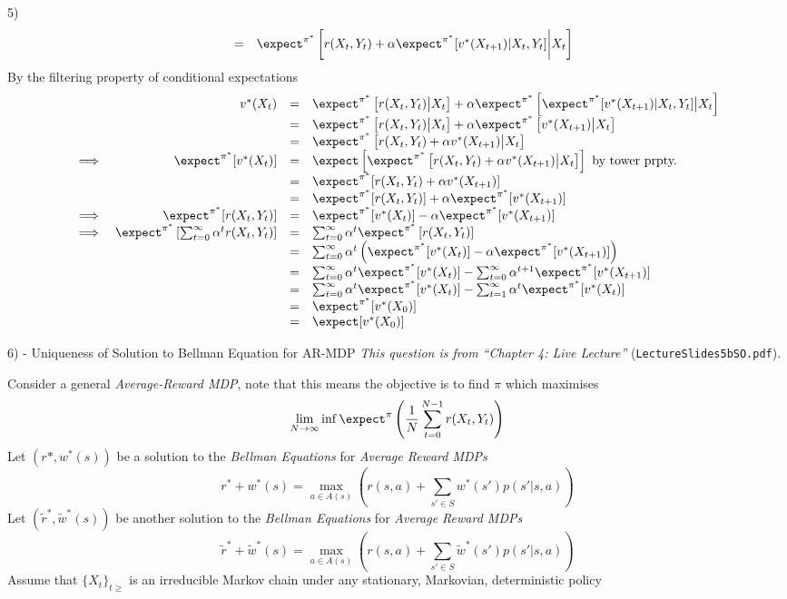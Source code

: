 \documentclass[11pt,a4paper]{article}
\begin{document}
\begin{answer}{5)}
\[\begin{array}{rcl}
    &=&\expect^{\pi^*}\left[r(X_t,Y_t)+\alpha\expect^{\pi^*}[v^*(X_{t+1})|X_t,Y_t]\bigg|X_t\right]
  \end{array}\]
  By the filtering property of conditional expectations
  \[\begin{array}{rrcl}
    &v^*(X_t)&=&\expect^{\pi^*}\left[r(X_t,Y_t)\big|X_t\right]+\alpha\expect^{\pi^*}\left[\expect^{\pi^*}[v^*(X_{t+1})|X_t,Y_t]\big|X_t\right]\\
    &&=&\expect^{\pi^*}\left[r(X_t,Y_t)\big|X_t\right]+\alpha\expect^{\pi^*}\left[v^*(X_{t+1})\big|X_t\right]\\
    &&=&\expect^{\pi^*}\left[r(X_t,Y_t)+\alpha v^*(X_{t+1})\big|X_t\right]\\
    \implies&\expect^{\pi^*}[v^*(X_t)]&=&\expect\left[\expect^{\pi^*}\left[r(X_t,Y_t)+\alpha v^*(X_{t+1})\big|X_t\right]\right]\text{ by tower prpty.}\\
    &&=&\expect^{\pi^*}[r(X_t,Y_t)+\alpha v^*(X_{t+1})]\\
    &&=&\expect^{\pi^*}[r(X_t,Y_t)]+\alpha \expect^{\pi^*}[v^*(X_{t+1})]\\
    \implies&\expect^{\pi^*}[r(X_t,Y_t)]&=&\expect^{\pi^*}[v^*(X_t)]-\alpha\expect^{\pi^*}[v^*(X_{t+1})]\\
    \implies&\expect^{\pi^*}\left[\sum_{t=0}^\infty\alpha^tr(X_t,Y_t)\right]&=&\sum_{t=0}^\infty\alpha^t\expect^{\pi^*}\left[r(X_t,Y_t)\right]\\
    &&=&\sum_{t=0}^\infty\alpha^t\left(\expect^{\pi^*}[v^*(X_t)]-\alpha\expect^{\pi^*}[v^*(X_{t+1})]\right)\\
    &&=&\sum_{t=0}^\infty\alpha^t\expect^{\pi^*}[v^*(X_t)]-\sum_{t=0}^\infty\alpha^{t+1}\expect^{\pi^*}[v^*(X_{t+1})]\\
    &&=&\sum_{t=0}^\infty\alpha^t\expect^{\pi^*}[v^*(X_t)]-\sum_{t=1}^\infty\alpha^t\expect^{\pi^*}[v^*(X_t)]\\
    &&=&\expect^{\pi^*}[v^*(X_0)]\\
    &&=&\expect[v^*(X_0)]
  \end{array}\]
\end{answer}

\newpage
\begin{question}{6) - Uniqueness of Solution to Bellman Equation for AR-MDP}
  \textit{This question is from ``Chapter 4: Live Lecture''} (\texttt{LectureSlides5bSO.pdf}).
  \par Consider a general \textit{Average-Reward MDP}, note that this means the objective is to find $\pi$ which maximises
  \[ \lim_{N\to\infty}\inf\expect^\pi\left(\frac1N\sum_{t=0}^{N-1}r(X_t,Y_t)\right) \]
  Let $(r*,w^*(s))$ be a solution to the \textit{Bellman Equations} for \textit{Average Reward MDPs}
  \[ r^*+w^*(s)=\max_{a\in A(s)}\left(r(s,a)+\sum_{s'\in S}w^*(s')p(s'|s,a)\right) \]
  Let $(\tilde{r}^*,\tilde{w}^*(s))$ be another solution to the \textit{Bellman Equations} for \textit{Average Reward MDPs}
  \[ \tilde{r}^*+\tilde{w}^*(s)=\max_{a\in A(s)}\left(r(s,a)+\sum_{s'\in S}\tilde{w}^*(s')p(s'|s,a)\right) \]
  Assume that $\{X_t\}_{t\geq}$ is an irreducible Markov chain under any stationary, Markovian, deterministic policy
\end{question}
\end{document}
